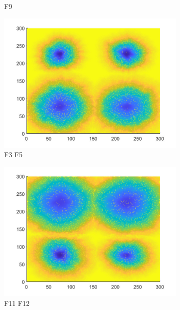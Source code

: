 \documentclass{mcmthesis}
\begin{document}
\begin{figure}[H]
\begin{subfigure}{0.3\textwidth}
		\caption{F9}
	\end{subfigure}
	\begin{subfigure}{0.3\textwidth}
		\includegraphics[width=\textwidth]{./T5Figure/K2N1/K2N1L.pdf}
		\caption{F3 F5}
	\end{subfigure}
	\begin{subfigure}{0.3\textwidth}
		\includegraphics[width=\textwidth]{./T5Figure/K2N2/K2N2L.pdf}
		\caption{F11 F12}
	\end{subfigure}
	\begin{subfigure}{0.3\textwidth}

\end{subfigure}
\end{figure}
\end{document}
